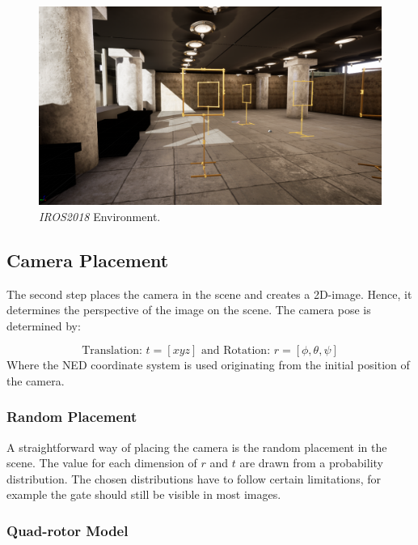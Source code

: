 \begin{figure}[hbtp]
\begin{minipage}{0.49\textwidth}
\end{minipage}
\begin{minipage}{0.49\textwidth}
	\includegraphics[width=\textwidth]{fig/iros_perspective}
\end{minipage}
\caption{\textit{IROS2018} Environment.}
\label{fig:environments}
\end{figure}

\subsection{Camera Placement}

The second step places the camera in the scene and creates a 2D-image. Hence, it determines the perspective of the image on the scene. The camera pose is determined by:

$$
\text{Translation: }t = [x y z] \text{ and Rotation: } r = [\phi, \theta, \psi]
$$
Where the \ac{NED} coordinate system is used originating from the initial position of the camera. 

\subsubsection{Random Placement}
	
A straightforward way of placing the camera is the random placement in the scene. The value for each dimension of $r$ and $t$ are drawn from a probability distribution. The chosen distributions have to follow certain limitations, for example the gate should still be visible in most images.
	
\subsubsection{Quad-rotor Model}
	
